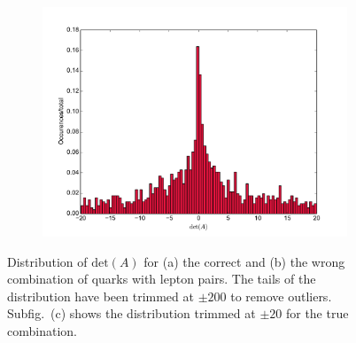\documentclass[twoside,english]{uiofysmaster}
\begin{document}
\begin{figure}[hbt]
	\begin{subfigure}[b]{0.45\textwidth}
		\includegraphics[width=\textwidth]{figures/improving_combinatorics/histogram_detA_truecomb_trim20.pdf} 
		\caption{}
	\label{fig:detA_distribution_zoom}
	\end{subfigure}
	\caption{Distribution of $\mathrm{det}(A)$ for (a) the correct and (b) the wrong combination of quarks with lepton pairs. The tails of the distribution have been trimmed at $\pm 200$ to remove outliers. Subfig.\ (c) shows the distribution trimmed at $\pm 20$ for the true combination.}
	\label{fig:detA_distribution}
\end{figure}
\end{document}
